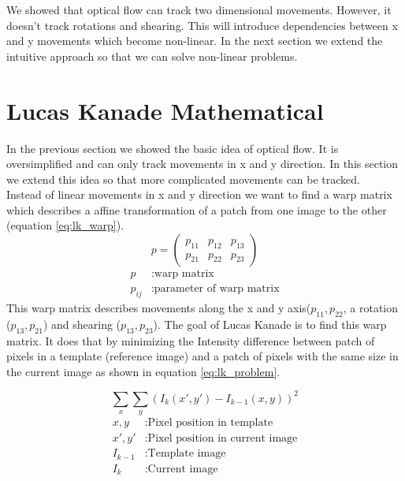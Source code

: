 \documentclass[11pt,a4paper,titlepage,oneside]{report}
\begin{document}
We showed that optical flow can track two dimensional movements. However, it doesn't track rotations and shearing. This will introduce dependencies between x and y movements which become non-linear. In the next section we extend the intuitive approach so that we can solve non-linear problems.

\section{Lucas Kanade Mathematical}

In the previous section we showed the basic idea of optical flow. It is oversimplified and can only track movements in x and y direction. In this section we extend this idea so that more complicated movements can be tracked.\\

Instead of linear movements in x and y direction we want to find a warp matrix which describes a affine transformation of a patch from one image to the other (equation \ref{eq:lk_warp}).
\begin{equation}\label{eq:lk_warp}
  p=\begin{pmatrix}
    p_{11} & p_{12} & p_{13} \\
    p_{21} & p_{22} & p_{23}
  \end{pmatrix}
\end{equation}
\begin{align*}
  p        &:  \text{warp matrix}\\
  p_{ij}  &:  \text{parameter of warp matrix}
\end{align*}
This warp matrix describes movements along the x and y axis($p_{11},p_{22}$, a rotation ($p_{13},p_{21}$) and shearing ($p_{13},p_{23}$). The goal of Lucas Kanade is to find this warp matrix. It does that by minimizing the Intensity difference between patch of pixels in a template (reference image) and a patch of pixels with the same size in the current image as shown in equation \ref{eq:lk_problem}. 

\begin{equation}\label{eq:lk_problem}
  \sum_x\sum_y(I_{k}(x',y')-I_{k-1}(x,y))^2
\end{equation}
\begin{align*}
  x,y        &:  \text{Pixel position in template}\\
  x',y'      &:  \text{Pixel position in current image}\\
  I_{k-1}    &:  \text{Template image}\\
  I_{k}      &:  \text{Current image}
\end{align*}
\end{document}
